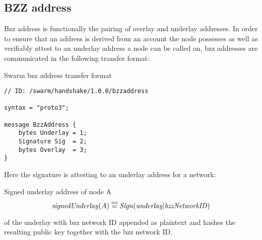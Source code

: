 


\subsection{BZZ address \statusyellow}

Bzz address is functionally the pairing of overlay and underlay addresses. In order to ensure that an address is derived from an account the node possesses as well as verifiably attest to an underlay address a node can be called on, bzz addresses are communicated in the following transfer format:

\begin{definition}{Swarm bzz address transfer format} \label{def:bzz-address}
\begin{lstlisting}[]
// ID: /swarm/handshake/1.0.0/bzzaddress

syntax = "proto3";

message BzzAddress {
    bytes Underlay = 1;
    Signature Sig  = 2;
    bytes Overlay  = 3; 
}
\end{lstlisting}
\end{definition}

Here the signature is attesting to an underlay address for a network:

\begin{definition}{Signed underlay address of node A}\label{def:signed-underlay}
\begin{equation}
\mathit{signedUnderlay}(A) \overset{\textrm{\tiny def}}{=} \mathit{Sign}(\mathit{underlay}|\mathit{bzzNetworkID})         
\end{equation}
\end{definition}

of the underlay with bzz network ID appended as plaintext and hashes the resulting public key together with the bzz network ID. 

